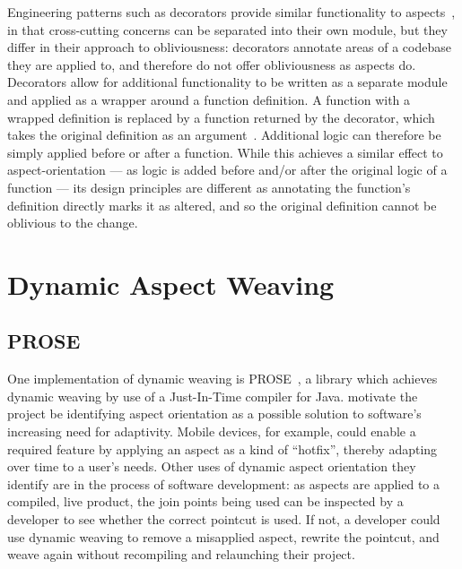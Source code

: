 Engineering patterns such as decorators provide similar functionality to
aspects~\cite{friesel2017annotations}, in that cross-cutting concerns can be
separated into their own module, but they differ in their approach to
obliviousness: decorators annotate areas of a codebase they are applied to, and
therefore do not offer obliviousness as aspects do. Decorators allow for
additional functionality to be written as a separate module and applied as a
wrapper around a function definition. A function with a wrapped
definition is replaced by a function returned by the decorator, which takes the
original definition as an argument~\citep{gof_design_patterns}. Additional logic
can therefore be simply applied before or after a function. While this achieves
a similar effect to aspect-orientation --- as logic is added before and/or after
the original logic of a function --- its design principles are different as
annotating the function's definition directly marks it as altered, and so the
original definition cannot be oblivious to the change.





\section{Dynamic Aspect Weaving}\label{sec:dynamic_aop_review}



\subsection{PROSE}

One implementation of dynamic weaving is
PROSE~\cite{popovici2002PROSE,popovici2003JITaspects}, a library which achieves
dynamic weaving by use of a Just-In-Time compiler for Java.
\citeauthor{popovici2002PROSE} motivate the project be identifying aspect
orientation as a possible solution to software's increasing need for
adaptivity.
Mobile devices, for example, could enable a required feature by applying an
aspect as a kind of ``hotfix'', thereby adapting over time to a user's needs.
Other uses of dynamic aspect orientation they identify are in the process of
software development: as aspects are applied to a compiled, live product, the
join points being used can be inspected by a developer to see whether the
correct pointcut is used. If not, a developer could use dynamic weaving to
remove a misapplied aspect, rewrite the pointcut, and weave again without
recompiling and relaunching their project.

